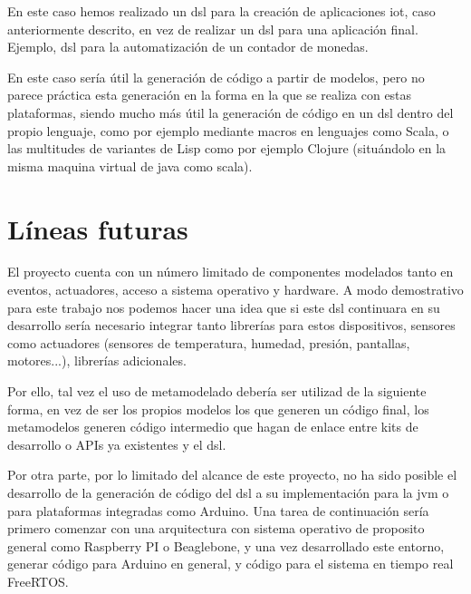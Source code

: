 En este caso hemos realizado un \gls{dsl} para la creación de aplicaciones \gls{iot}, caso anteriormente descrito, en vez de realizar un \gls{dsl} para una aplicación final. Ejemplo, \gls{dsl} para la automatización de un contador de monedas.

En este caso sería útil la generación de código a partir de modelos, pero no parece práctica esta generación en la forma en la que se realiza con estas plataformas, siendo mucho más útil la generación de código en un \gls{dsl} dentro del propio lenguaje, como por ejemplo mediante macros en lenguajes como Scala, o las multitudes de variantes de Lisp como por ejemplo Clojure (situándolo en la misma maquina virtual de java como scala).


\section{Líneas futuras}

El proyecto cuenta con un número limitado de componentes modelados tanto en eventos, actuadores, acceso a sistema operativo y hardware. A modo demostrativo para este trabajo nos podemos hacer una idea que si este \gls{dsl} continuara en su desarrollo sería necesario integrar tanto librerías para estos dispositivos, sensores como actuadores (sensores de temperatura, humedad, presión, pantallas, motores...), librerías adicionales.

Por ello, tal vez el uso de \gls{metamodelado} debería ser utilizad de la siguiente forma, en vez de ser los propios modelos los que generen un código final, los metamodelos generen código intermedio que hagan de enlace entre kits de desarrollo o APIs ya existentes y el \gls{dsl}.

Por otra parte, por lo limitado del alcance de este proyecto, no ha sido posible el desarrollo de la generación de código del \gls{dsl} a su implementación para la \gls{jvm} o para plataformas integradas como Arduino. Una tarea de continuación sería primero comenzar con una arquitectura con sistema operativo de proposito general como Raspberry PI o Beaglebone, y una vez desarrollado este entorno, generar código para Arduino en general, y código para el sistema en tiempo real FreeRTOS.
